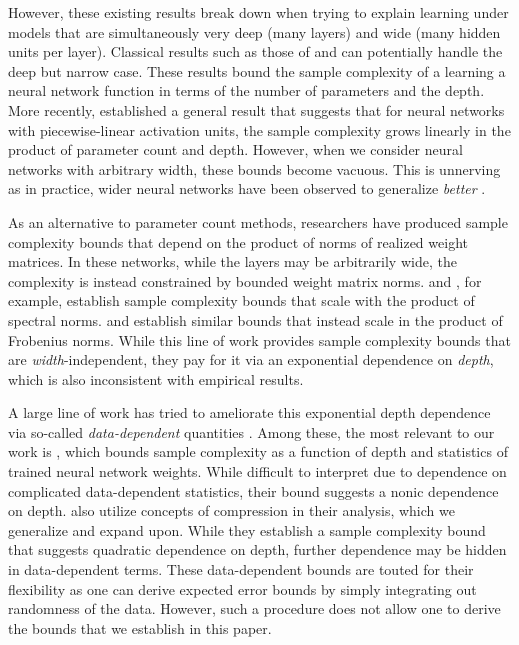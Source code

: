 \documentclass[twoside,11pt]{article}
\begin{document}
However, these existing results break down when trying to explain learning under models that are simultaneously very deep (many layers) and wide (many hidden units per layer). Classical results such as those of \citet{HAUSSLER199278} and \cite{bartlett1998almost} can potentially handle the deep but narrow case. These results bound the sample complexity of a learning a neural network function in terms of the number of parameters and the depth. More recently, \cite{pmlr-v65-harvey17a} established a general result that suggests that for neural networks with piecewise-linear activation units, the sample complexity grows linearly in the product of parameter count and depth. However, when we consider neural networks with arbitrary width, these bounds become vacuous. This is unnerving as in practice, wider neural networks have been observed to generalize \emph{better} \citep{neyshabur2014search}.

As an alternative to parameter count methods, researchers have produced sample complexity bounds that depend on the product of norms of realized weight matrices. In these networks, while the layers may be arbitrarily wide, the complexity is instead constrained by bounded weight matrix norms. \cite{bartlett2017spectrally} and \cite{neyshabur2018pac}, for example, establish sample complexity bounds that scale with the product of spectral norms. \cite{neyshabur2015norm} and \cite{pmlr-v75-golowich18a} establish similar bounds that instead scale in the product of Frobenius norms. While this line of work provides sample complexity bounds that are \emph{width}-independent, they pay for it via an exponential dependence on \emph{depth}, which is also inconsistent with empirical results. 

A large line of work has tried to ameliorate this exponential depth dependence via so-called {\it data-dependent} quantities \citep{dziugaite2017computing,arora2018stronger,nagarajan2018deterministic,NEURIPS2019_0e795480}. Among these, the most relevant to our work is \cite{NEURIPS2019_0e795480}, which bounds sample complexity as a function of depth and statistics of trained neural network weights. While difficult to interpret due to dependence on complicated data-dependent statistics, their bound suggests a nonic dependence on depth. \cite{arora2018stronger} also utilize concepts of compression in their analysis, which we generalize and expand upon. While they establish a sample complexity bound that suggests quadratic dependence on depth, further dependence may be hidden in data-dependent terms. These data-dependent bounds are touted for their flexibility as one can derive expected error bounds by simply integrating out randomness of the data. However, such a procedure does not allow one to derive the bounds that we establish in this paper.
\end{document}
